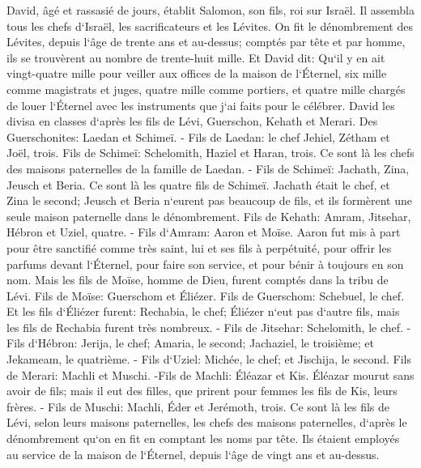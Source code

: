 \verse David, âgé et rassasié de jours, établit Salomon, son fils, roi sur Israël. 
\verse Il assembla tous les chefs d`Israël, les sacrificateurs et les Lévites. 
\verse On fit le dénombrement des Lévites, depuis l`âge de trente ans et au-dessus; comptés par tête et par homme, ils se trouvèrent au nombre de trente-huit mille. 
\verse Et David dit: Qu`il y en ait vingt-quatre mille pour veiller aux offices de la maison de l`Éternel, six mille comme magistrats et juges, 
\verse quatre mille comme portiers, et quatre mille chargés de louer l`Éternel avec les instruments que j`ai faits pour le célébrer. 
\verse David les divisa en classes d`après les fils de Lévi, Guerschon, Kehath et Merari. 
\verse Des Guerschonites: Laedan et Schimeï. - 
\verse Fils de Laedan: le chef Jehiel, Zétham et Joël, trois. 
\verse Fils de Schimeï: Schelomith, Haziel et Haran, trois. Ce sont là les chefs des maisons paternelles de la famille de Laedan. - 
\verse Fils de Schimeï: Jachath, Zina, Jeusch et Beria. Ce sont là les quatre fils de Schimeï. 
\verse Jachath était le chef, et Zina le second; Jeusch et Beria n`eurent pas beaucoup de fils, et ils formèrent une seule maison paternelle dans le dénombrement. 
\verse Fils de Kehath: Amram, Jitsehar, Hébron et Uziel, quatre. - 
\verse Fils d`Amram: Aaron et Moïse. Aaron fut mis à part pour être sanctifié comme très saint, lui et ses fils à perpétuité, pour offrir les parfums devant l`Éternel, pour faire son service, et pour bénir à toujours en son nom. 
\verse Mais les fils de Moïse, homme de Dieu, furent comptés dans la tribu de Lévi. 
\verse Fils de Moïse: Guerschom et Éliézer. 
\verse Fils de Guerschom: Schebuel, le chef. 
\verse Et les fils d`Éliézer furent: Rechabia, le chef; Éliézer n`eut pas d`autre fils, mais les fils de Rechabia furent très nombreux. - 
\verse Fils de Jitsehar: Schelomith, le chef. - 
\verse Fils d`Hébron: Jerija, le chef; Amaria, le second; Jachaziel, le troisième; et Jekameam, le quatrième. - 
\verse Fils d`Uziel: Michée, le chef; et Jischija, le second. 
\verse Fils de Merari: Machli et Muschi. -Fils de Machli: Éléazar et Kis. 
\verse Éléazar mourut sans avoir de fils; mais il eut des filles, que prirent pour femmes les fils de Kis, leurs frères. - 
\verse Fils de Muschi: Machli, Éder et Jerémoth, trois. 
\verse Ce sont là les fils de Lévi, selon leurs maisons paternelles, les chefs des maisons paternelles, d`après le dénombrement qu`on en fit en comptant les noms par tête. Ils étaient employés au service de la maison de l`Éternel, depuis l`âge de vingt ans et au-dessus. 
